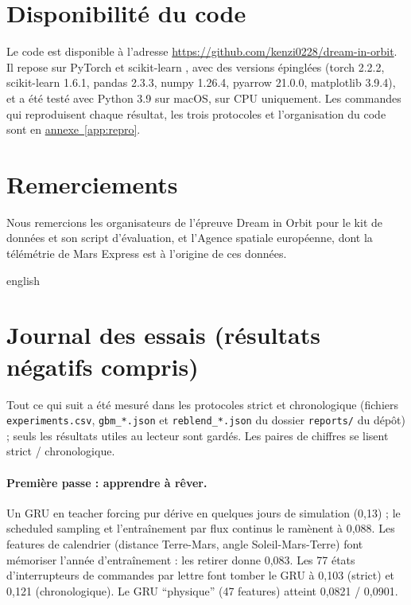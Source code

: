 \documentclass[11pt,a4paper]{article}
\newcommand{\annexeref}[1]{\hyperref[#1]{annexe~\ref*{#1}}}
\begin{document}
\section*{Disponibilité du code}

Le code est disponible à l'adresse \url{https://github.com/kenzi0228/dream-in-orbit}. Il repose sur PyTorch \citep{paszke2019pytorch} et scikit-learn \citep{pedregosa2011scikit}, avec des versions épinglées (torch 2.2.2, scikit-learn 1.6.1, pandas 2.3.3, numpy 1.26.4, pyarrow 21.0.0, matplotlib 3.9.4), et a été testé avec Python 3.9 sur macOS, sur CPU uniquement. Les commandes qui reproduisent chaque résultat, les trois protocoles et l'organisation du code sont en \annexeref{app:repro}.

\section*{Remerciements}

Nous remercions les organisateurs de l'épreuve Dream in Orbit pour le kit de données et son script d'évaluation, et l'Agence spatiale européenne, dont la télémétrie de Mars Express est à l'origine de ces données.

\begin{otherlanguage*}{english}


\end{otherlanguage*}

\appendix
\makeatletter
\renewcommand{\@seccntformat}[1]{Annexe~\csname the#1\endcsname\quad}
\makeatother

\section{Journal des essais (résultats négatifs compris)}\label{app:journal}

Tout ce qui suit a été mesuré dans les protocoles strict et chronologique (fichiers \texttt{experiments.csv}, \texttt{gbm\_*.json} et \texttt{reblend\_*.json} du dossier \texttt{reports/} du dépôt) ; seuls les résultats utiles au lecteur sont gardés. Les paires de chiffres se lisent strict / chronologique.

\paragraph{Première passe : apprendre à rêver.} Un GRU en teacher forcing pur dérive en quelques jours de simulation (0,13) ; le scheduled sampling et l'entraînement par flux continus le ramènent à 0,088. Les features de calendrier (distance Terre-Mars, angle Soleil-Mars-Terre) font mémoriser l'année d'entraînement : les retirer donne 0,083. Les 77 états d'interrupteurs de commandes par lettre font tomber le GRU à 0,103 (strict) et 0,121 (chronologique). Le GRU \enquote{physique} (47 features) atteint 0,0821 / 0,0901.
\end{document}
